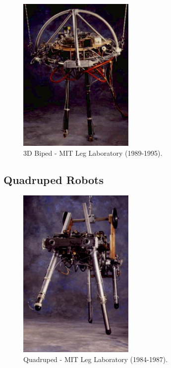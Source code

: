 \begin{figure}[H]
\centering
\includegraphics[width=0.5\textwidth]{images/literature/3D-biped.jpeg} 
\caption{3D Biped - MIT Leg Laboratory (1989-1995).}
\label{fig:3D-biped}
\end{figure}


\subsection{Quadruped Robots}

\begin{figure}[H]
\centering
\includegraphics[width=0.5\textwidth]{images/literature/quadruped.jpeg} 
\caption{Quadruped - MIT Leg Laboratory (1984-1987).}
\label{fig:quadruped}
\end{figure}

